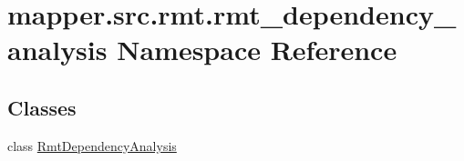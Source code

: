 \hypertarget{namespacemapper_1_1src_1_1rmt_1_1rmt__dependency__analysis}{}\section{mapper.\+src.\+rmt.\+rmt\+\_\+dependency\+\_\+analysis Namespace Reference}
\label{namespacemapper_1_1src_1_1rmt_1_1rmt__dependency__analysis}
\subsection*{Classes}
\begin{DoxyCompactItemize}
\item 
class \hyperlink{classmapper_1_1src_1_1rmt_1_1rmt__dependency__analysis_1_1_rmt_dependency_analysis}{Rmt\+Dependency\+Analysis}
\end{DoxyCompactItemize}
